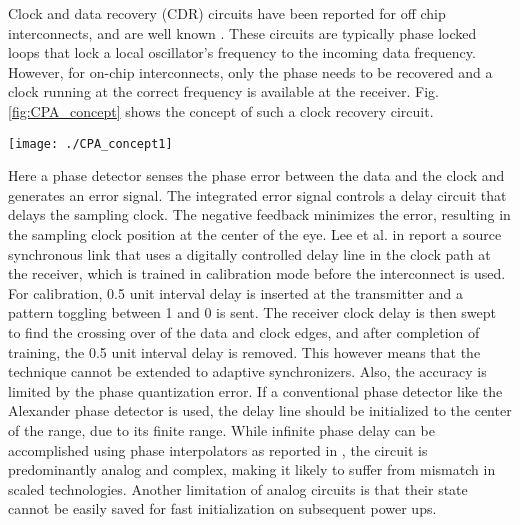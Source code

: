 \documentclass[journal,twoside,letterpaper]{IEEEtran}
\begin{document}
Clock and data recovery (CDR) circuits have been reported 
for off chip interconnects, and 
are well known \cite{CDR_razavi}. These circuits are typically phase locked loops
that lock a local oscillator's frequency to the incoming data frequency.
However, for on-chip interconnects, only the phase needs to be recovered
and a clock running at the correct frequency is available at the receiver.
Fig. \ref{fig:CPA_concept} shows the concept of such a clock recovery circuit.
\begin{figure*}[t!]
\centering
\texttt{[image: ./CPA\_concept1]}
\caption{Conceptual block diagram of the clock
recovery system at the receiver of a low swing interconnect system. 
\mbox{LPF - Low pass filter.}}
\label{fig:CPA_concept}
\end{figure*}
Here a phase detector senses the phase error between the data and the clock
and generates an error signal. The integrated error signal controls a
delay circuit that delays the sampling clock. The negative feedback 
minimizes the error, resulting in the sampling clock position at the
center of the eye.
Lee et al.
in \cite{Lee-jssc14} report a source synchronous link that uses 
a digitally controlled delay line in the clock path at the receiver, which is 
trained in calibration
mode before the interconnect is used. 
For calibration, 0.5 unit interval delay is inserted at the transmitter 
and a pattern toggling between 1 and 0 is sent. 
The receiver clock delay is then swept
to find the crossing over of the data and clock edges,
and after completion of training, the 0.5 unit interval delay is removed.
This however means that
the technique cannot be extended to adaptive synchronizers.
Also, the accuracy is limited by the phase quantization error.
If a conventional phase detector like the Alexander phase detector is used,
the delay line should be initialized to the center of the range,
due to its finite range.
While infinite phase delay can be accomplished using phase interpolators
as reported in \cite{phase_interpolator}, the circuit is
predominantly analog and complex,
making it likely to suffer from mismatch in scaled technologies.
Another limitation of analog circuits is that their state cannot 
be easily saved for fast initialization on subsequent power ups. 
\end{document}
